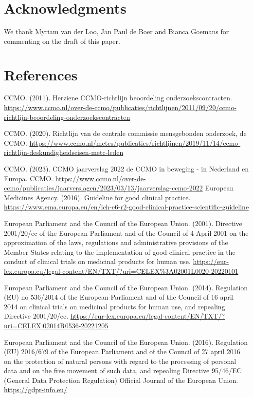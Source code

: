 \documentclass[authordate, meta]{jote-new-article}
\begin{document}
\section{Acknowledgments}



We thank Myriam van der Loo, Jan Paul de Boer and Bianca Goemans for commenting on the draft of this paper.

\section{References}

CCMO. (2011). Herziene CCMO-richtlijn beoordeling onderzoekscontracten. \url{https://www.ccmo.nl/over-de-ccmo/publicaties/richtlijnen/2011/09/20/ccmo-richtlijn-beoordeling-onderzoekscontracten}

CCMO. (2020). Richtlijn van de centrale commissie mensgebonden onderzoek, de CCMO. \url{https://www.ccmo.nl/metcs/publicaties/richtlijnen/2019/11/14/ccmo-richtlijn-deskundigheidseisen-metc-leden}

CCMO. (2023). CCMO jaarverslag 2022 de CCMO in beweging - in Nederland en Europa. CCMO. \url{https://www.ccmo.nl/over-de-ccmo/publicaties/jaarverslagen/2023/03/13/jaarverslag-ccmo-2022} European Medicines Agency. (2016). Guideline for good clinical practice. \url{https://www.ema.europa.eu/en/ich-e6-r2-good-clinical-practice-scientific-guideline}

European Parliament and the Council of the European Union. (2001). Directive 2001/20/ec of the European Parliament and of the Council of 4 April 2001 on the approximation of the laws, regulations and administrative provisions of the Member States relating to the implementation of good clinical practice in the conduct of clinical trials on medicinal products for human use. \url{https://eur-lex.europa.eu/legal-content/EN/TXT/?uri=CELEX%3A02001L0020-20220101}

European Parliament and the Council of the European Union. (2014). Regulation (EU) no 536/2014 of the European Parliament and of the Council of 16 april 2014 on clinical trials on medicinal products for human use, and repealing Directive 2001/20/ec. \url{https://eur-lex.europa.eu/legal-content/EN/TXT/?uri=CELEX:02014R0536-20221205}

European Parliament and the Council of the European Union. (2016). Regulation (EU) 2016/679 of the European Parliament and of the Council of 27 april 2016 on the protection of natural persons with regard to the processing of personal data and on the free movement of such data, and repealing Directive 95/46/EC (General Data Protection Regulation) Official Journal of the European Union. \url{https://gdpr-info.eu/}
\end{document}
